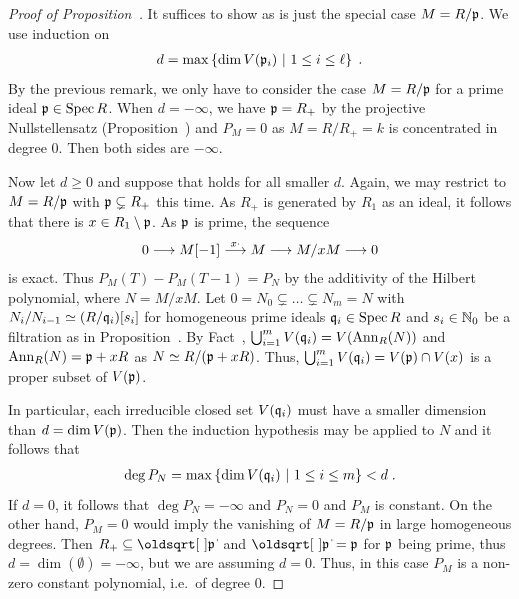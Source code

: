 \documentclass[a4paper,parskip=half,numbers=enddot, DIV=12]{scrreprt}
\begin{document}
\begin{proof}[Proof of Proposition~]
    It suffices to show   as  is just the special case $M=R/\mathfrak{p}$. We use induction on 
    \begin{align*}
	    d=\max\left\{\dim V(\mathfrak{p}_i)\ \middle|\  1\leq i\leq \ell\right\}\;.
    \end{align*}
    By the previous remark, we only have to consider the case $M=R/\mathfrak{p}$ for a prime ideal $\mathfrak{p}\in\operatorname{Spec} R$. When $d=-\infty$, we have $\mathfrak{p}=R_+$ by the projective Nullstellensatz (Proposition~) and $P_M=0$ as $M=R/R_+=k$ is concentrated in degree $0$. Then both sides are $-\infty$. 
    
    Now let $d\geq 0$ and suppose that  holds for all smaller $d$. Again, we may restrict to $M=R/\mathfrak{p}$ with $\mathfrak{p}\subsetneq R_+$ this time. As $R_+$ is generated by $R_1$ as an ideal, it follows that there is $x\in R_1\setminus \mathfrak{p}$. As $\mathfrak{p}$ is prime, the sequence
    \begin{align*}
        0 \morphism M[-1] \morphism[x\cdot] M \morphism M/x M \morphism 0
    \end{align*}
    is exact. Thus $P_M(T) -P_M(T-1) = P_N$ by the additivity of the Hilbert polynomial, where $N = M/xM $. Let $0 = N_0\subsetneq \ldots \subsetneq N_m = N$ with $N_i/N_{i-1} \simeq (R/\mathfrak{q}_i)[s_i]$ for homogeneous prime ideals $\mathfrak{q}_i\in \operatorname{Spec} R$  and $s_i\in \mathbb{N}_0$ be a filtration as in Proposition~. By Fact~, $\bigcup_{i=1}^m V(\mathfrak{q}_i) = V(\operatorname{Ann}_R(N))$ and $\operatorname{Ann}_R(N) = \mathfrak{p}+ xR$ as $N\simeq R/(\mathfrak{p}+xR)$. Thus, $\bigcup_{i=1}^m V(\mathfrak{q}_i) = V(\mathfrak{p})\cap V(x)$ is a proper subset of $V(\mathfrak{p})$. 
    
    In particular, each irreducible closed set $V(\mathfrak{q}_i)$ must have a smaller dimension than $d=\dim V(\mathfrak{p})$. Then the induction hypothesis may be applied to $N$ and it follows that 
    \begin{align*}
    	\deg P_N = \max\left\{\dim V(\mathfrak{q}_i)\ \middle|\  1\leq i \leq m\right\} < d\;.
    \end{align*}
    If $d=0$, it follows that $\deg P_N = -\infty$ and $P_N=0$ and $P_M$ is constant. On the other hand, $P_M = 0$ would imply the vanishing of $M=R/\mathfrak{p}$ in large homogeneous degrees. Then $R_+\subseteq\sqrt{\pp}$ and $\sqrt{\pp}=\pp$ for $\mathfrak{p}$ being prime, thus $d=\dim(\emptyset)=-\infty$, but we are assuming $d=0$. Thus, in this case $P_M$ is a non-zero constant polynomial, i.e.\ of degree $0$. 
    

\end{proof}
\end{document}
